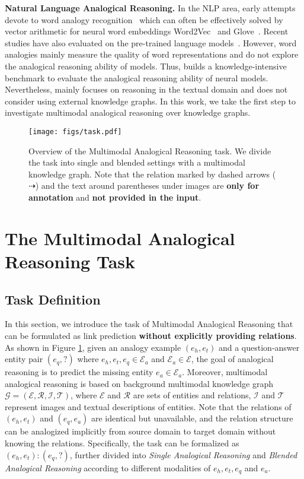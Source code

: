\documentclass{article} \usepackage{iclr2023_conference,times}
\begin{document}
\textbf{Natural Language Analogical Reasoning.}
In the NLP area, early attempts devote to word analogy recognition~\citep{mikolov-etal-2013-linguistic,BATs,DBLP:conf/semeval/JurgensMTH12,DBLP:conf/acl/EthayarajhDH19a,DBLP:conf/naacl/GladkovaDM16} which can often be effectively solved by vector arithmetic for neural word embeddings Word2Vec~\citep{word2vec} and Glove~\citep{glove}. 
Recent studies have also evaluated on the pre-trained language models~\citep{bert,gpt,DBLP:conf/acl/UshioASC20}.
However, word analogies mainly measure the quality of word representations and do not explore the analogical reasoning ability of models. 
Thus, \cite{E-KAR} builds a knowledge-intensive benchmark to evaluate the analogical reasoning ability of neural models.
Nevertheless, \cite{E-KAR} mainly focuses on reasoning in the textual domain and does not consider using external knowledge graphs. 
In this work, we take the first step to investigate multimodal analogical reasoning over knowledge graphs.

\begin{figure}[!t]
\centering
\texttt{[image: figs/task.pdf]}
\caption{
Overview of the Multimodal Analogical Reasoning task. 
We divide the task into single and blended settings with a multimodal knowledge graph.
Note that the relation marked by dashed arrows ($\dashrightarrow$) and the text around parentheses under images are \textbf{only for annotation} and \textbf{not provided in the input}.}
\label{fig:task}
\vspace{-0.3cm}
\end{figure}

\section{The Multimodal Analogical Reasoning Task}
\subsection{Task Definition}

In this section, we introduce the task of Multimodal Analogical Reasoning that can be formulated as link prediction  \textbf{without explicitly providing relations}. 
As shown in Figure \ref{fig:task}, given an analogy example $(e_h, e_t)$ and a question-answer entity pair $(e_q, ?)$ where
$e_h, e_t, e_q \in \mathcal{E}_a$ and  $ \mathcal{E}_a \in \mathcal{E}$,
the goal of analogical reasoning is to predict the missing entity $e_a \in \mathcal{E}_a$. 
Moreover, multimodal analogical reasoning is based on
background multimodal knowledge graph $\mathcal{G}=({\mathcal{E},\mathcal{R}, \mathcal{I}, \mathcal{T}})$, where $\mathcal{E}$ and $\mathcal{R}$
are sets of entities and relations,
$\mathcal{I}$ and $\mathcal{T}$ represent images and textual descriptions of entities. 
Note that the relations of $(e_h, e_t)$ and $(e_q, e_a)$ are identical but unavailable, and the relation structure can be analogized implicitly from source domain to target domain without knowing the relations.
Specifically, the task can be formalized as $(e_h, e_t):(e_q,?)$, further divided into \emph{Single Analogical Reasoning} and \emph{Blended Analogical Reasoning} according to different modalities of $e_h, e_t, e_q$ and $e_a$.
\end{document}
